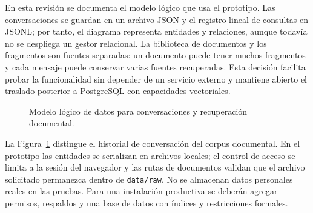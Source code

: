En esta revisión se documenta el modelo lógico que usa el prototipo. Las conversaciones se guardan en un archivo JSON y el
registro lineal de consultas en JSONL; por tanto, el diagrama representa entidades y relaciones, aunque todavía no se
despliega un gestor relacional. La biblioteca de documentos y los fragmentos son fuentes separadas: un documento puede
tener muchos fragmentos y cada mensaje puede conservar varias fuentes recuperadas. Esta decisión facilita probar la
funcionalidad sin depender de un servicio externo y mantiene abierto el traslado posterior a PostgreSQL con capacidades
vectoriales.

\begin{figure}[H]
\centering
{}
\caption{Modelo lógico de datos para conversaciones y recuperación documental.}
\label{fig:modelo_datos}
\end{figure}

La Figura~\ref{fig:modelo_datos} distingue el historial de conversación del corpus documental. En el prototipo las
entidades se serializan en archivos locales; el control de acceso se limita a la sesión del navegador y las rutas de
documentos validan que el archivo solicitado permanezca dentro de \texttt{data/raw}. No se almacenan datos personales reales
en las pruebas. Para una instalación productiva se deberán agregar permisos, respaldos y una base de datos con índices y
restricciones formales.


